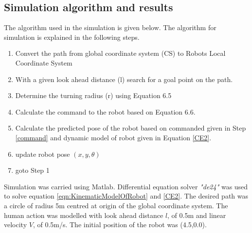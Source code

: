\subsection{Simulation algorithm and  results} 
The algorithm used in the simulation is given below.
The algorithm for simulation is explained in the following steps.
\begin{enumerate}
	\item Convert the path from global coordinate system (CS) to Robots Local Coordinate System
	\item With a given look ahead distance (l) search for a goal point on the path.
	\item Determine the turning radius (r) using Equation 6.5
	\item \label{command} Calculate the command to the robot based on Equation 6.6.
	\item Calculate the predicted pose of the robot  based on commanded given in Step \ref{command} and dynamic model of robot given in Equation \ref{CE2}.
	\item update robot pose $(x,y,\theta)$
	\item goto Step 1 
\end{enumerate} 

 Simulation was carried using Matlab. Differential equation solver \textit{"de24"} was used to solve equation \ref{eqn:KinematicModelOfRobot} and \ref{CE2}.  The desired path  was a circle of radius 5m centred at origin of the global coordinate system. The human action was modelled with look ahead distance $l$, of 0.5m and linear velocity $V$, of 0.5m/s. The initial position of the robot was (4.5,0.0).
 
